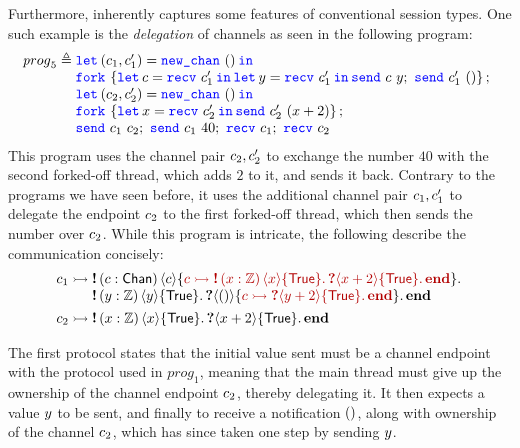 Furthermore, \lname inherently captures some features of conventional
session types.
One such example is the \emph{delegation} of channels as seen in the following program:
\[
{\mathit prog}_5
\eqdef{}
\begin{array}[t]{@{} l}
  \Let {(\chan_1, \chan_1')} = \newchan in \\
  \Fork{ \Let \chan = \recv {\chan_1'} in
    \Let \varB = \recv {\chan_1'} in
    \send \chan \varB;\ \send {\chan_1'} \TT};\\
  \Let {(\chan_2, \chan_2')} = \newchan in \\
  \Fork{ \Let {\var} = \recv {\chan_2'} in {\send {\chan_2'} (\var + 2 )} }; \\
  \send {\chan_1} {\chan_2};\ \send {\chan_1} {40};\ \recv {\chan_1};\ \recv {\chan_2}
\end{array}
\]
This program uses the channel pair $c_2,c_2'$ to exchange the number $40$ with the second forked-off thread, which adds $2$ to it, and sends it back.
Contrary to the programs we have seen before, it uses the
additional channel pair $c_1,c_1'$ to delegate the endpoint
$c_2$ to the first forked-off thread, which then sends the number over $c_2$.
While this program is intricate, the following \pname describe the communication concisely:
\begin{align*}
\interp{\chan_1{}&}{
  \begin{array}[t]{@{} l @{}}
  \sendprot {(\chan:\Chan)} \chan {\textcolor{darkred}{
    \interp \chan {
      \sendprot {(\var:\integer)} \var \TRUE {
      \recvprot {} {\var+2} \TRUE \protend}
    }}} \\
  \sendprot {(\varB:\integer)} \varB {\TRUE}
  \recvprot {} \TT {\textcolor{darkred}{
    \interp \chan {\recvprot {} {\varB+2} \TRUE \protend}
  }} \protend
  \end{array}} \\
\interp{\chan_2{}&}{
  \sendprot {(\var:\integer)} \var \TRUE
  \recvprot {} {\var + 2} \TRUE \protend}
\end{align*}

\noindent
The first protocol states that the initial value sent must be a channel
endpoint with the protocol used in ${\mathit prog}_1$, meaning that the main thread must
give up the ownership of the channel endpoint $c_2$, thereby delegating it.
It then expects a value $y$ to be sent, and finally to receive a
notification $()$, along with ownership of the channel $c_2$,
which has since taken one step by sending $y$.

